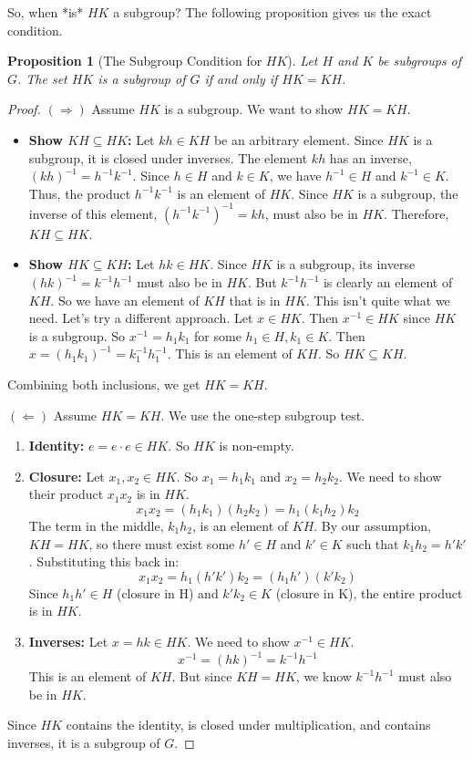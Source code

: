 \documentclass[12pt,a4paper]{article}
\theoremstyle{plain} %
\newtheorem{proposition}[theorem]{Proposition}
\theoremstyle{definition} %
\theoremstyle{remark} %
\begin{document}
So, when *is* $HK$ a subgroup? The following proposition gives us the exact condition.

\begin{proposition}[The Subgroup Condition for $HK$]
Let $H$ and $K$ be subgroups of $G$. The set $HK$ is a subgroup of $G$ if and only if $HK = KH$.
\end{proposition}

\begin{proof}
$(\Rightarrow)$ Assume $HK$ is a subgroup. We want to show $HK=KH$.
\begin{itemize}
    \item \textbf{Show $KH \subseteq HK$:} Let $kh \in KH$ be an arbitrary element. Since $HK$ is a subgroup, it is closed under inverses. The element $kh$ has an inverse, $(kh)^{-1} = h^{-1}k^{-1}$. Since $h \in H$ and $k \in K$, we have $h^{-1} \in H$ and $k^{-1} \in K$. Thus, the product $h^{-1}k^{-1}$ is an element of $HK$. Since $HK$ is a subgroup, the inverse of this element, $(h^{-1}k^{-1})^{-1} = kh$, must also be in $HK$. Therefore, $KH \subseteq HK$.

    \item \textbf{Show $HK \subseteq KH$:} Let $hk \in HK$. Since $HK$ is a subgroup, its inverse $(hk)^{-1} = k^{-1}h^{-1}$ must also be in $HK$. But $k^{-1}h^{-1}$ is clearly an element of $KH$. So we have an element of $KH$ that is in $HK$. This isn't quite what we need. Let's try a different approach. Let $x \in HK$. Then $x^{-1} \in HK$ since $HK$ is a subgroup. So $x^{-1} = h_1k_1$ for some $h_1 \in H, k_1 \in K$. Then $x = (h_1k_1)^{-1} = k_1^{-1}h_1^{-1}$. This is an element of $KH$. So $HK \subseteq KH$.
\end{itemize}
Combining both inclusions, we get $HK = KH$.

$(\Leftarrow)$ Assume $HK=KH$. We use the one-step subgroup test.
\begin{enumerate}
    \item \textbf{Identity:} $e = e \cdot e \in HK$. So $HK$ is non-empty.
    \item \textbf{Closure:} Let $x_1, x_2 \in HK$. So $x_1=h_1k_1$ and $x_2=h_2k_2$. We need to show their product $x_1x_2$ is in $HK$.
    \[
    x_1x_2 = (h_1k_1)(h_2k_2) = h_1(k_1h_2)k_2
    \]
    The term in the middle, $k_1h_2$, is an element of $KH$. By our assumption, $KH=HK$, so there must exist some $h' \in H$ and $k' \in K$ such that $k_1h_2 = h'k'$.
    Substituting this back in:
    \[
    x_1x_2 = h_1(h'k')k_2 = (h_1h') (k'k_2)
    \]
    Since $h_1h' \in H$ (closure in H) and $k'k_2 \in K$ (closure in K), the entire product is in $HK$.
    \item \textbf{Inverses:} Let $x = hk \in HK$. We need to show $x^{-1} \in HK$.
    \[
    x^{-1} = (hk)^{-1} = k^{-1}h^{-1}
    \]
    This is an element of $KH$. But since $KH=HK$, we know $k^{-1}h^{-1}$ must also be in $HK$.
\end{enumerate}
Since $HK$ contains the identity, is closed under multiplication, and contains inverses, it is a subgroup of $G$.
\end{proof}
\end{document}
